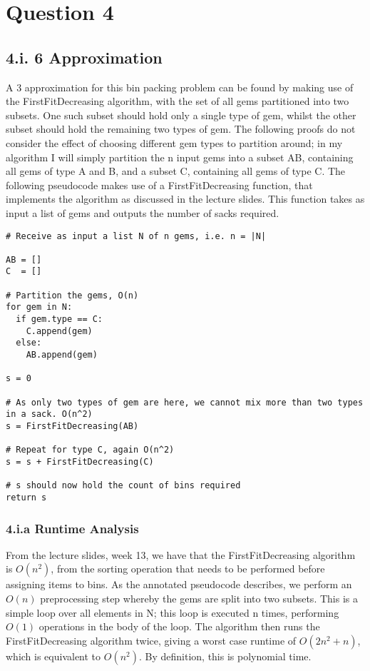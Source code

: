 \documentclass[paper=a4, fontsize=12pt]{article}
\begin{document}
\section{Question 4}

\subsection{4.i. 6 Approximation}

A 3 approximation for this bin packing problem can be found by making use of the FirstFitDecreasing algorithm, with the set of all gems partitioned into two subsets. One such subset should hold only a single type of gem, whilst the other subset should hold the remaining two types of gem. The following proofs do not consider the effect of choosing different gem types to partition around; in my algorithm I will simply partition the n input gems into a subset AB, containing all gems of type A and B, and a subset C, containing all gems of type C. The following pseudocode makes use of a FirstFitDecreasing function, that implements the algorithm as discussed in the lecture slides. This function takes as input a list of gems and outputs the number of sacks required.

\begin{verbatim}
# Receive as input a list N of n gems, i.e. n = |N|

AB = []
C  = []

# Partition the gems, O(n)
for gem in N:
  if gem.type == C:
    C.append(gem)
  else:
    AB.append(gem)

s = 0

# As only two types of gem are here, we cannot mix more than two types in a sack. O(n^2)
s = FirstFitDecreasing(AB)

# Repeat for type C, again O(n^2)
s = s + FirstFitDecreasing(C)

# s should now hold the count of bins required
return s
\end{verbatim}

\subsubsection{4.i.a Runtime Analysis}
From the lecture slides, week 13, we have that the FirstFitDecreasing algorithm is \(O(n^2)\), from the sorting operation that needs to be performed before assigning items to bins. As the annotated pseudocode describes, we perform an \(O(n)\) preprocessing step whereby the gems are split into two subsets. This is a simple loop over all elements in N; this loop is executed n times, performing \(O(1)\) operations in the body of the loop. The algorithm then runs the FirstFitDecreasing algorithm twice, giving a worst case runtime of \(O(2n^2 + n)\), which is equivalent to \(O(n^2)\). By definition, this is polynomial time.
\end{document}
